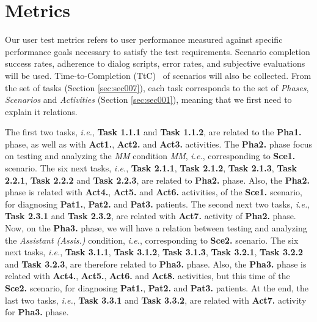 
\section{Metrics}
\label{sec:sec008}

Our user test metrics refers to user performance measured against specific performance goals necessary to satisfy the test requirements. Scenario completion success rates, adherence to dialog scripts, error rates, and subjective evaluations will be used. Time-to-Completion (TtC)~\cite{ioannidis1998effect} of scenarios will also be collected. From the set of tasks (Section \ref{sec:sec007}), each task corresponds to the set of {\it Phases}, {\it Scenarios} and {\it Activities} (Section \ref{sec:sec001}), meaning that we first need to explain it relations.

The first two tasks, {\it i.e.}, {\bf Task 1.1.1} and {\bf Task 1.1.2}, are related to the {\bf Pha1.} phase, as well as with {\bf Act1.}, {\bf Act2.} and {\bf Act3.} activities. The {\bf Pha2.} phase focus on testing and analyzing the {\it \gls{MM}} condition {\it \gls{MM}}, {\it i.e.}, corresponding to {\bf Sce1.} scenario. The six next tasks, {\it i.e.}, {\bf Task 2.1.1}, {\bf Task 2.1.2}, {\bf Task 2.1.3}, {\bf Task 2.2.1}, {\bf Task 2.2.2} and {\bf Task 2.2.3}, are related to {\bf Pha2.} phase. Also, the {\bf Pha2.} phase is related with {\bf Act4.}, {\bf Act5.} and {\bf Act6.} activities, of the {\bf Sce1.} scenario, for diagnosing {\bf Pat1.}, {\bf Pat2.} and {\bf Pat3.} patients. The second next two tasks, {\it i.e.}, {\bf Task 2.3.1} and {\bf Task 2.3.2}, are related with {\bf Act7.} activity of {\bf Pha2.} phase. Now, on the {\bf Pha3.} phase, we will have a relation between testing and analyzing the {\it Assistant (Assis.)} condition, {\it i.e.}, corresponding to {\bf Sce2.} scenario. The six next tasks, {\it i.e.}, {\bf Task 3.1.1}, {\bf Task 3.1.2}, {\bf Task 3.1.3}, {\bf Task 3.2.1}, {\bf Task 3.2.2} and {\bf Task 3.2.3}, are therefore related to {\bf Pha3.} phase. Also, the {\bf Pha3.} phase is related with {\bf Act4.}, {\bf Act5.}, {\bf Act6.} and {\bf Act8.} activities, but this time of the {\bf Sce2.} scenario, for diagnosing {\bf Pat1.}, {\bf Pat2.} and {\bf Pat3.} patients. At the end, the last two tasks, {\it i.e.}, {\bf Task 3.3.1} and {\bf Task 3.3.2}, are related with {\bf Act7.} activity for {\bf Pha3.} phase.

